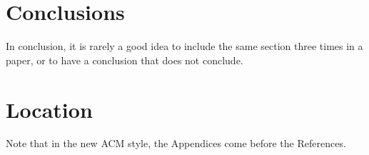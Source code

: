 










\section{Conclusions}

In conclusion, it is rarely a good idea to include the same section three times in a paper, or to have a conclusion that does not conclude.

\appendix

\section{Location}

Note that in the new ACM style, the Appendices come before the References.


\begin{acks}
\end{acks}
